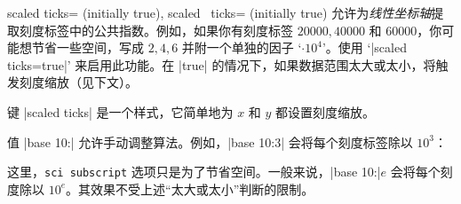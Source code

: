 \begin{pgfplotsxykeylist}{%
    scaled ticks= (initially true),
    scaled \x\ ticks= (initially true)%
}
    允许为\emph{线性坐标轴}提取刻度标签中的公共指数。例如，如果你有刻度标签 $20000,40000$ 和 $60000$，你可能想节省一些空间，写成 $2,4,6$ 并附一个单独的因子 `$\cdot 10^4$'。使用 `|scaled ticks=true|' 来启用此功能。在 |true| 的情况下，如果数据范围太大或太小，将触发刻度缩放（见下文）。
\begin{codeexample}[]
%
\end{codeexample}

\begin{codeexample}[]
\end{codeexample}

    键 |scaled ticks| 是一个样式，它简单地为 $x$ 和 $y$ 都设置刻度缩放。

    值 |base 10:| 允许手动调整算法。例如，|base 10:3| 会将每个刻度标签除以 $10^3$：
\begin{codeexample}[]
\end{codeexample}
    \noindent 这里，\texttt{sci subscript} 选项只是为了节省空间。一般来说，|base 10:|$e$ 会将每个刻度除以 $10^e$。其效果不受上述“太大或太小”判断的限制。


\end{pgfplotsxykeylist}

